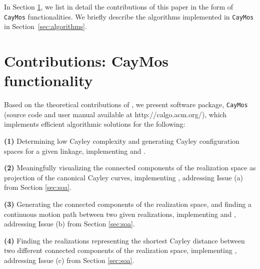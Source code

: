 \documentclass[prodmode,acmtoms]{acmsmall}
\begin{document}
In Section \ref{sec:contributions}, 
we list in detail the contributions of this paper in the form of \texttt{CayMos} functionalities. 
We briefly describe the algorithms implemented in \texttt{CayMos} in Section~\ref{sec:algorithms}.



\section{Contributions: CayMos functionality}
\label{sec:contributions}


Based on the theoretical  contributions of , 
we present software package, \texttt{CayMos} \citep{bib:caymos} (source code and user manual available at http://calgo.acm.org/), 
which implements efficient algorithmic solutions for the following: 

\noindent\textbf{(1)} Determining low Cayley complexity and generating Cayley configuration spaces for a given linkage,
implementing \cite[Section B]{Sitharam2011a} and \cite[Theorem 2]{Sitharam2011b}.

\noindent\textbf{(2)} Meaningfully visualizing the %
connected components of the realization space as projection of the canonical Cayley curves, 
implementing \cite[Theorem 3]{sitharam2014beast}, addressing Issue (a) from Section \ref{sec:soa}.

\noindent\textbf{(3)} Generating the connected components of the realization space, 
and finding a continuous motion path between two given realizations, 
implementing \cite[Theorem 3]{Sitharam2011a} and \cite[Theorem 5(i)]{sitharam2014beast}, addressing Issue (b) from Section \ref{sec:soa}.

\noindent\textbf{(4)} Finding the realizations representing the shortest Cayley distance between two different connected components of the realization space, 
implementing \cite[Theorem 5(ii)]{sitharam2014beast}, addressing Issue (c) from Section \ref{sec:soa}.
\end{document}
